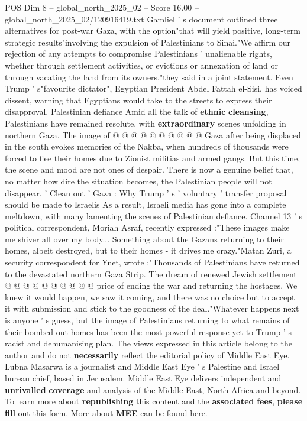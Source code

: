 \begin{textsample}{POS Dim 8 – global\_north\_2025\_02 – Score 16.00 – global\_north\_2025\_02/120916419.txt}
Gamliel ' s document outlined three alternatives for post-war Gaza, with the option"that will yield positive, long-term strategic results"involving the expulsion of Palestinians to Sinai."We affirm our rejection of any attempts to compromise Palestinians ' unalienable rights, whether through settlement activities, or evictions or annexation of land or through vacating the land from its owners,"they said in a joint statement.
Even Trump ' s"favourite dictator", Egyptian President Abdel Fattah el-Sisi, has voiced dissent, warning that Egyptians would take to the streets to express their disapproval.
Palestinian defiance Amid all the talk of \textbf{ethnic} \textbf{cleansing}, Palestinians have remained resolute, with \textbf{extraordinary} scenes unfolding in northern Gaza.
The image of @ @ @ @ @ @ @ @ @ @ Gaza after being displaced in the south evokes memories of the Nakba, when hundreds of thousands were forced to flee their homes due to Zionist militias and armed gangs.
But this time, the scene and mood are not ones of despair.
There is now a genuine belief that, no matter how dire the situation becomes, the Palestinian people will not disappear. ' Clean out ' Gaza : Why Trump ' s ' voluntary ' transfer proposal should be made to Israelis As a result, Israeli media has gone into a complete meltdown, with many lamenting the scenes of Palestinian defiance.
Channel 13 ' s political correspondent, Moriah Asraf, recently expressed :"These images make me shiver all over my body...
Something about the Gazans returning to their homes, albeit destroyed, but to their homes - it drives me crazy."Matan Zuri, a security correspondent for Ynet, wrote :"Thousands of Palestinians have returned to the devastated northern Gaza Strip.
The dream of renewed Jewish settlement @ @ @ @ @ @ @ @ @ @ price of ending the war and returning the hostages.
We knew it would happen, we saw it coming, and there was no choice but to accept it with submission and stick to the goodness of the deal."Whatever happens next is anyone ' s guess, but the image of Palestinians returning to what remains of their bombed-out homes has been the most powerful response yet to Trump ' s racist and dehumanising plan.
The views expressed in this article belong to the author and do not \textbf{necessarily} reflect the editorial policy of Middle East Eye.
Lubna Masarwa is a journalist and Middle East Eye ' s Palestine and Israel bureau chief, based in Jerusalem.
Middle East Eye delivers independent and \textbf{unrivalled} \textbf{coverage} and analysis of the Middle East, North Africa and beyond.
To learn more about \textbf{republishing} this content and the \textbf{associated} \textbf{fees}, \textbf{please} \textbf{fill} out this form.
More about \textbf{MEE} can be found here.

\end{textsample}
